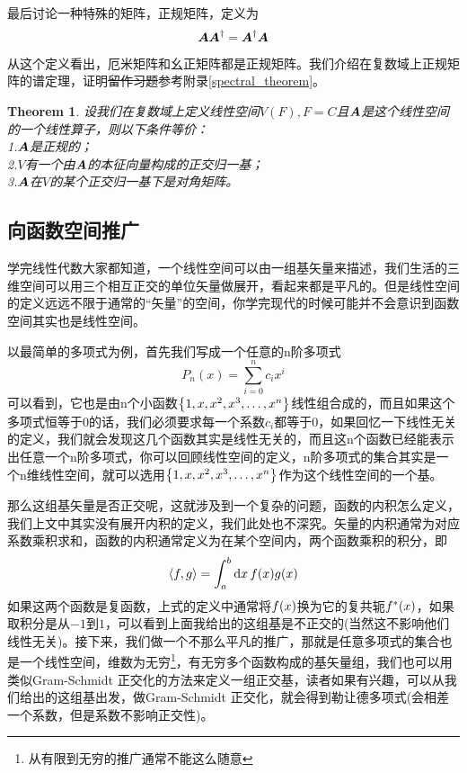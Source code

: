 \documentclass[12pt,a4paper,openany,twoside]{book}
\newtheorem{theorem}{Theorem}[section]
\numberwithin{equation}{section}
\newcommand{\mean}[1]{\left\langle #1 \right\rangle}
\begin{document}
            最后讨论一种特殊的矩阵，正规矩阵，定义为
            \begin{equation}
              \vb*{A}\vb*{A}^\dagger=\vb*{A}^\dagger\vb*{A}
            \end{equation}
            从这个定义看出，厄米矩阵和幺正矩阵都是正规矩阵。我们介绍在复数域上正规矩阵的谱定理，证明\sout{留作习题}参考附录\ref{spectral_theorem}。
            \begin{theorem}
              设我们在复数域上定义线性空间$V(F),F=C$且$\vb*{A}$是这个线性空间的一个线性算子，则以下条件等价：\\
              1.$\vb*{A}$是正规的；\\
              2.$V$有一个由$\vb*{A}$的本征向量构成的正交归一基；\\
              3.$\vb*{A}$在$V$的某个正交归一基下是对角矩阵。
            \end{theorem}

          \subsection{向函数空间推广}
            学完线性代数大家都知道，一个线性空间可以由一组基矢量来描述，我们生活的三维空间可以用三个相互正交的单位矢量做展开，看起来都是平凡的。但是线性空间的定义远远不限于通常的“矢量”的空间，你学完现代的时候可能并不会意识到函数空间其实也是线性空间。

            以最简单的多项式为例，首先我们写成一个任意的n阶多项式
            \begin{equation}
              P_n(x)=\sum_{i=0}^n{c_i x^i}
            \end{equation}
            可以看到，它也是由n个小函数$\qty{1,x,x^2,x^3,\dots,x^n}$线性组合成的，而且如果这个多项式恒等于0的话，我们必须要求每一个系数$c_i$都等于0，如果回忆一下线性无关的定义，我们就会发现这几个函数其实是线性无关的，而且这n个函数已经能表示出任意一个n阶多项式，你可以回顾线性空间的定义，n阶多项式的集合其实是一个n维线性空间，就可以选用$\qty{1,x,x^2,x^3,\dots,x^n}$作为这个线性空间的一个基。

            那么这组基矢量是否正交呢，这就涉及到一个复杂的问题，函数的内积怎么定义，我们上文中其实没有展开内积的定义，我们此处也不深究。矢量的内积通常为对应系数乘积求和，函数的内积通常定义为在某个空间内，两个函数乘积的积分，即
            \begin{equation}
              \mean{f,g}=\int_a^b{\dd{x} f\qty(x)g\qty(x)}
            \end{equation}
            如果这两个函数是复函数，上式的定义中通常将$f\qty(x)$换为它的复共轭$f^*\qty(x)$，如果取积分是从$-1$到$1$，可以看到上面我给出的这组基是不正交的(当然这不影响他们线性无关)。接下来，我们做一个不那么平凡的推广，那就是任意多项式的集合也是一个线性空间，维数为无穷\footnote{从有限到无穷的推广通常不能这么随意}，有无穷多个函数构成的基矢量组，我们也可以用类似Gram-Schmidt 正交化的方法来定义一组正交基，读者如果有兴趣，可以从我们给出的这组基出发，做Gram-Schmidt 正交化，就会得到勒让德多项式(会相差一个系数，但是系数不影响正交性)。
\end{document}
